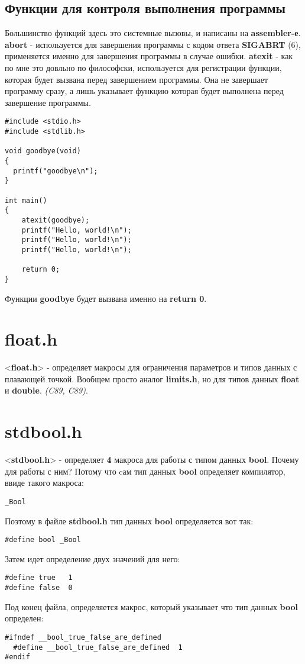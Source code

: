 \documentclass[12pt, letterpaper]{article}
\begin{document}
\subsection{Функции для контроля выполнения программы}
Большинство функций здесь это системные вызовы, и написаны на \textbf{assembler-е}.
\newline
\newline
\textbf{abort} - используется для завершения программы с кодом ответа \textbf{SIGABRT} (6), применяется именно для завершения программы в случае ошибки.
\newline
\newline
\textbf{atexit} - как по мне это довльно по философски, используется для регистрации функции, которая будет вызвана перед завершением программы.
Она не завершает программу сразу, а лишь указывает функцию которая будет выполнена перед завершение программы.
\begin{lstlisting}
#include <stdio.h>
#include <stdlib.h>

void goodbye(void)
{
  printf("goodbye\n");
}

int main()
{
    atexit(goodbye);
    printf("Hello, world!\n");
    printf("Hello, world!\n");
    printf("Hello, world!\n");

    return 0;
}
\end{lstlisting}
Функции \textbf{goodbye} будет вызвана именно на \textbf{return 0}.


\section{float.h}
<\textbf{float.h}> - определяет макросы для ограничения параметров и типов данных с плавающей точкой.
Вообщем просто аналог \textbf{limits.h}, но для типов данных \textbf{float} и \textbf{double}. \textit{(C89, C89)}.

\section{stdbool.h}
<\textbf{stdbool.h}> - определяет \textbf{4} макроса для работы с типом данных \textbf{bool}.
Почему для работы с ним? Потому что cам тип данных \textbf{bool} определяет компилятор, ввиде такого макроса:
\begin{lstlisting}
_Bool
\end{lstlisting}
Поэтому в файле \textbf{stdbool.h} тип данных \textbf{bool} определяется вот так:
\begin{lstlisting}
#define bool _Bool
\end{lstlisting}
Затем идет определение двух значений для него:
\begin{lstlisting}
#define true   1
#define false  0
\end{lstlisting}
Под конец файла, определяется макрос, который указывает что тип данных \textbf{bool} определен:
\begin{lstlisting}
#ifndef __bool_true_false_are_defined
  #define __bool_true_false_are_defined  1
#endif
\end{lstlisting}
\end{document}
